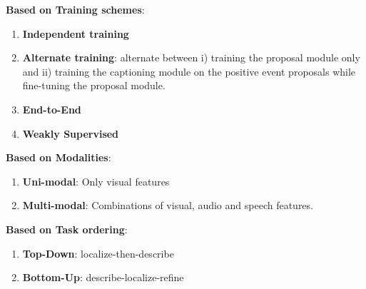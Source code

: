 \noindent\textbf{Based on Training schemes}:
\begin{enumerate}
	\item \textbf{Independent training}
	\item \textbf{Alternate training}: alternate between i) training the proposal module only and ii) training the captioning module on the positive event proposals while fine-tuning the proposal module.
	\item \textbf{End-to-End}
	\item \textbf{Weakly Supervised}
\end{enumerate}

\noindent\textbf{Based on Modalities}:
\begin{enumerate}
	\item \textbf{Uni-modal}: Only visual features
	\item \textbf{Multi-modal}: Combinations of visual, audio and speech features.
\end{enumerate}

\noindent\textbf{Based on Task ordering}:
\begin{enumerate}
	\item \textbf{Top-Down}: localize-then-describe
	\item \textbf{Bottom-Up}: describe-localize-refine
\end{enumerate}